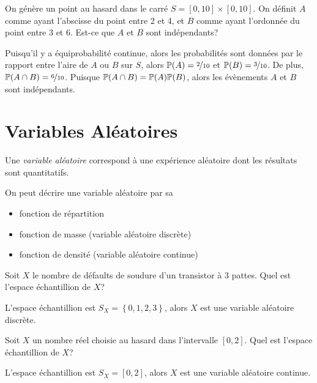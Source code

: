 \documentclass[11pt]{article}
\renewcommand\P{%
	\ensuremath{%
		\mathbb{P}%
	}%
}%
\begin{document}
\begin{exemple}
	On génère un point au hasard dans le carré $S=[0,10]\times[0,10]$. On
	définit $A$ comme ayant l'abscisse du point entre 2 et 4, et $B$ comme
	ayant l'ordonnée du point entre 3 et 6. Est-ce que $A$ et $B$ sont
	indépendants?
	\begin{figure}[H]
		\centering
		
	\end{figure}
\end{exemple}
\addtocounter{exemple}{-1}
\begin{exemple}[suite]
	Puisqu'il y a équiprobabilité continue, alors les probabilités sont données
	par le rapport entre l'aire de $A$ ou $B$ sur $S$, alors
	$\P(A)=\nicefrac{2}{10}$ et $\P(B)=\nicefrac{3}{10}$. De plus,
	$\P(A\cap B)=\nicefrac{6}{10}$. Puisque $\P(A\cap B)=\P(A)\P(B)$, alors les
	évènements $A$ et $B$ sont indépendants.
\end{exemple}

\section{Variables Aléatoires}
\begin{definition}
	Une \textit{variable aléatoire} correspond à une expérience aléatoire dont
	les résultats sont quantitatifs.
\end{definition}

On peut décrire une variable aléatoire par sa
\begin{itemize}
	\item fonction de répartition
	\item fonction de masse (variable aléatoire discrète)
	\item fonction de densité (variable aléatoire continue)
\end{itemize}

\begin{exemple}
	Soit $X$ le nombre de défaults de soudure d'un transistor à 3 pattes. Quel
	est l'espace échantillion de $X$?

	L'espace échantillion est $S_X=\left\{0,1,2,3\right\}$, alors $X$ est une
	variable aléatoire discrète.
\end{exemple}

\begin{exemple}
	Soit $X$ un nombre réel choisie au hasard dans l'intervalle $[0,2]$. Quel
	est l'espace échantillion de $X$?

	L'espace échantillion est $S_X=[0,2]$, alors $X$ est une variable aléatoire
	continue.
\end{exemple}
\end{document}
